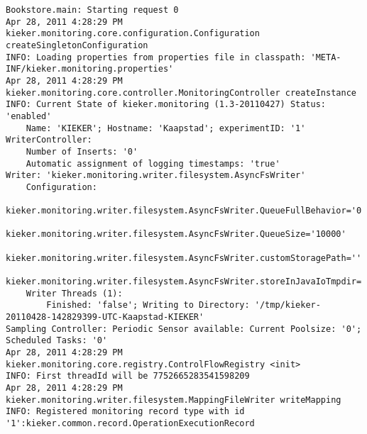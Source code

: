 \setTextListing
\begin{lstlisting}[caption=Execution of the Bookstore with AspectJ trace instrumentation (Section~\ref{sec:traceAnalysis:instr:AspectJ})]
Bookstore.main: Starting request 0
Apr 28, 2011 4:28:29 PM kieker.monitoring.core.configuration.Configuration createSingletonConfiguration
INFO: Loading properties from properties file in classpath: 'META-INF/kieker.monitoring.properties'
Apr 28, 2011 4:28:29 PM kieker.monitoring.core.controller.MonitoringController createInstance
INFO: Current State of kieker.monitoring (1.3-20110427) Status: 'enabled'
	Name: 'KIEKER'; Hostname: 'Kaapstad'; experimentID: '1'
WriterController:
	Number of Inserts: '0'
	Automatic assignment of logging timestamps: 'true'
Writer: 'kieker.monitoring.writer.filesystem.AsyncFsWriter'
	Configuration:
		kieker.monitoring.writer.filesystem.AsyncFsWriter.QueueFullBehavior='0'
		kieker.monitoring.writer.filesystem.AsyncFsWriter.QueueSize='10000'
		kieker.monitoring.writer.filesystem.AsyncFsWriter.customStoragePath=''
		kieker.monitoring.writer.filesystem.AsyncFsWriter.storeInJavaIoTmpdir='true'
	Writer Threads (1): 
		Finished: 'false'; Writing to Directory: '/tmp/kieker-20110428-142829399-UTC-Kaapstad-KIEKER'
Sampling Controller: Periodic Sensor available: Current Poolsize: '0'; Scheduled Tasks: '0'
Apr 28, 2011 4:28:29 PM kieker.monitoring.core.registry.ControlFlowRegistry <init>
INFO: First threadId will be 7752665283541598209
Apr 28, 2011 4:28:29 PM kieker.monitoring.writer.filesystem.MappingFileWriter writeMapping
INFO: Registered monitoring record type with id '1':kieker.common.record.OperationExecutionRecord
\end{lstlisting}


